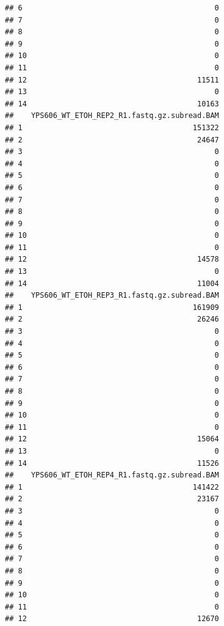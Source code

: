 \documentclass[
]{book}
\begin{document}
\begin{verbatim}
## 6                                            0
## 7                                            0
## 8                                            0
## 9                                            0
## 10                                           0
## 11                                           0
## 12                                       11511
## 13                                           0
## 14                                       10163
##    YPS606_WT_ETOH_REP2_R1.fastq.gz.subread.BAM
## 1                                       151322
## 2                                        24647
## 3                                            0
## 4                                            0
## 5                                            0
## 6                                            0
## 7                                            0
## 8                                            0
## 9                                            0
## 10                                           0
## 11                                           0
## 12                                       14578
## 13                                           0
## 14                                       11004
##    YPS606_WT_ETOH_REP3_R1.fastq.gz.subread.BAM
## 1                                       161909
## 2                                        26246
## 3                                            0
## 4                                            0
## 5                                            0
## 6                                            0
## 7                                            0
## 8                                            0
## 9                                            0
## 10                                           0
## 11                                           0
## 12                                       15064
## 13                                           0
## 14                                       11526
##    YPS606_WT_ETOH_REP4_R1.fastq.gz.subread.BAM
## 1                                       141422
## 2                                        23167
## 3                                            0
## 4                                            0
## 5                                            0
## 6                                            0
## 7                                            0
## 8                                            0
## 9                                            0
## 10                                           0
## 11                                           0
## 12                                       12670

\end{verbatim}
\end{document}
